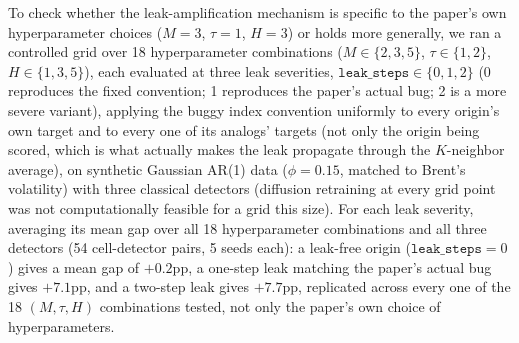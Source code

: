 \documentclass[preprint,12pt]{elsarticle}
\begin{document}
To check whether the leak-amplification mechanism is specific to the paper's own hyperparameter
choices ($M=3$, $\tau=1$, $H=3$) or holds more generally, we ran a controlled grid over 18
hyperparameter combinations ($M \in \{2,3,5\}$, $\tau \in \{1,2\}$, $H \in \{1,3,5\}$), each
evaluated at three leak severities, $\texttt{leak\_steps} \in \{0,1,2\}$ (0 reproduces the fixed
convention; 1 reproduces the paper's actual bug; 2 is a more severe variant), applying the buggy
index convention uniformly to every origin's own target and to every one of its analogs' targets
(not only the origin being scored, which is what actually makes the leak propagate through the
$K$-neighbor average), on synthetic Gaussian AR(1) data ($\phi=0.15$, matched to Brent's
volatility) with three classical detectors (diffusion retraining at every grid point was not
computationally feasible for a grid this size). For each leak severity, averaging its mean gap
over all 18 hyperparameter combinations and all three detectors (54 cell-detector pairs, 5 seeds
each): a leak-free origin ($\texttt{leak\_steps}=0$) gives a mean gap of $+0.2$pp, a one-step
leak matching the paper's actual bug gives $+7.1$pp, and a two-step leak gives $+7.7$pp,
replicated across every one of the 18 $(M,\tau,H)$ combinations tested, not only the paper's own
choice of hyperparameters.
\end{document}
